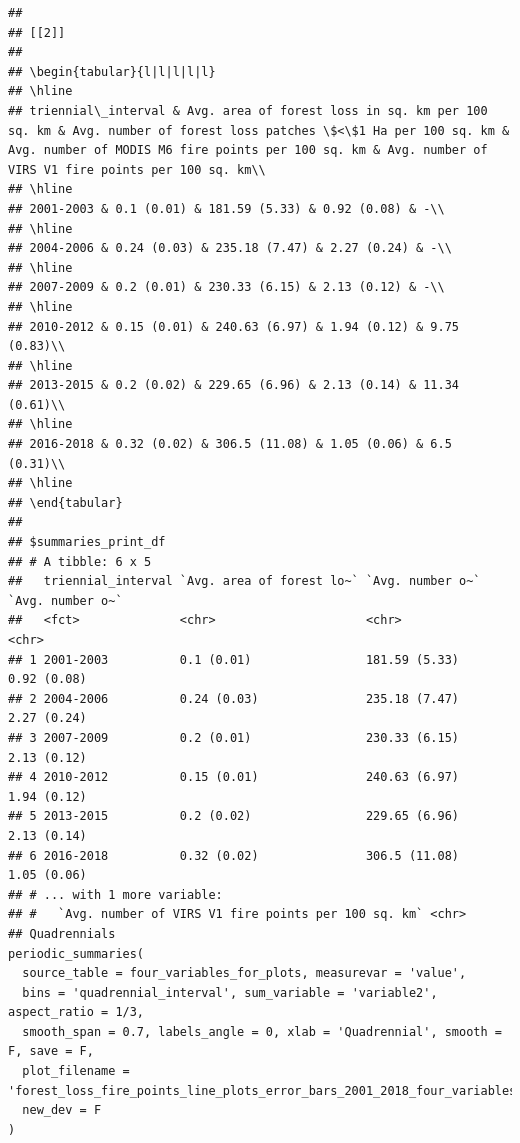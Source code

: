 \documentclass[10pt,landscape,a3paper]{article}
\begin{document}
\begin{verbatim}
## 
## [[2]]
## 
## \begin{tabular}{l|l|l|l|l}
## \hline
## triennial\_interval & Avg. area of forest loss in sq. km per 100 sq. km & Avg. number of forest loss patches \$<\$1 Ha per 100 sq. km & Avg. number of MODIS M6 fire points per 100 sq. km & Avg. number of VIRS V1 fire points per 100 sq. km\\
## \hline
## 2001-2003 & 0.1 (0.01) & 181.59 (5.33) & 0.92 (0.08) & -\\
## \hline
## 2004-2006 & 0.24 (0.03) & 235.18 (7.47) & 2.27 (0.24) & -\\
## \hline
## 2007-2009 & 0.2 (0.01) & 230.33 (6.15) & 2.13 (0.12) & -\\
## \hline
## 2010-2012 & 0.15 (0.01) & 240.63 (6.97) & 1.94 (0.12) & 9.75 (0.83)\\
## \hline
## 2013-2015 & 0.2 (0.02) & 229.65 (6.96) & 2.13 (0.14) & 11.34 (0.61)\\
## \hline
## 2016-2018 & 0.32 (0.02) & 306.5 (11.08) & 1.05 (0.06) & 6.5 (0.31)\\
## \hline
## \end{tabular}
## 
## $summaries_print_df
## # A tibble: 6 x 5
##   triennial_interval `Avg. area of forest lo~` `Avg. number o~` `Avg. number o~`
##   <fct>              <chr>                     <chr>            <chr>           
## 1 2001-2003          0.1 (0.01)                181.59 (5.33)    0.92 (0.08)     
## 2 2004-2006          0.24 (0.03)               235.18 (7.47)    2.27 (0.24)     
## 3 2007-2009          0.2 (0.01)                230.33 (6.15)    2.13 (0.12)     
## 4 2010-2012          0.15 (0.01)               240.63 (6.97)    1.94 (0.12)     
## 5 2013-2015          0.2 (0.02)                229.65 (6.96)    2.13 (0.14)     
## 6 2016-2018          0.32 (0.02)               306.5 (11.08)    1.05 (0.06)     
## # ... with 1 more variable:
## #   `Avg. number of VIRS V1 fire points per 100 sq. km` <chr>
## Quadrennials
periodic_summaries(
  source_table = four_variables_for_plots, measurevar = 'value',
  bins = 'quadrennial_interval', sum_variable = 'variable2', aspect_ratio = 1/3,
  smooth_span = 0.7, labels_angle = 0, xlab = 'Quadrennial', smooth = F, save = F,
  plot_filename = 'forest_loss_fire_points_line_plots_error_bars_2001_2018_four_variables_quadrennial.jpg',
  new_dev = F
)
\end{verbatim}
\end{document}
